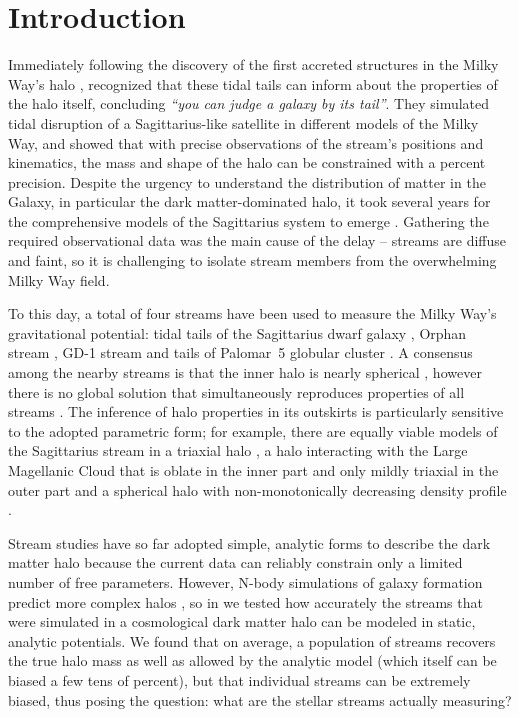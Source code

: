 \documentclass[modern]{aastex61}
\begin{document}

\section{Introduction} \label{sec:intro}
Immediately following the discovery of the first accreted structures in the Milky Way's halo \citep{ibata1994, ti1998}, \citet{johnston1999} recognized that these tidal tails can inform about the properties of the halo itself, concluding \emph{``you can judge a galaxy by its tail''}.
They simulated tidal disruption of a Sagittarius-like satellite in different models of the Milky Way, and showed that with precise observations of the stream's positions and kinematics, the mass and shape of the halo can be constrained with a percent precision.
Despite the urgency to understand the distribution of matter in the Galaxy, in particular the dark matter-dominated halo, it took several years for the comprehensive models of the Sagittarius system to emerge \citep{helmi2004, johnston2005, lm10}.
Gathering the required observational data was the main cause of the delay -- streams are diffuse and faint, so it is challenging to isolate stream members from the overwhelming Milky Way field.

To this day, a total of four streams have been used to measure the Milky Way's gravitational potential: tidal tails of the Sagittarius dwarf galaxy \citep{lm10,gibbons2014,dl2017}, Orphan stream \citep{newberg2010}, GD-1 stream \citep{koposov2010, bowden2015} and tails of Palomar~5 globular cluster \citep{kupper2015}.
A consensus among the nearby streams is that the inner halo is nearly spherical \citep{bovy2016}, however there is no global solution that simultaneously reproduces properties of all streams \citep{pearson2015}.
The inference of halo properties in its outskirts is particularly sensitive to the adopted parametric form; for example, there are equally viable models of the Sagittarius stream in a triaxial halo \citep{lm10}, a halo interacting with the Large Magellanic Cloud that is oblate in the inner part and only mildly triaxial in the outer part \citep{vch2013} and a spherical halo with non-monotonically decreasing density profile \citep{ibata2013}. 

Stream studies have so far adopted simple, analytic forms to describe the dark matter halo because the current data can reliably constrain only a limited number of free parameters.
However, N-body simulations of galaxy formation predict more complex halos \citep[e.g.,][]{diemand2007,springel2008,wetzel2016}, 
so in \citet{bonaca2014} we tested how accurately the streams that were simulated in a cosmological dark matter halo can be modeled in static, analytic potentials.
We found that on average, a population of streams recovers the true halo mass as well as allowed by the analytic model (which itself can be biased a few tens of percent), but that individual streams can be extremely biased, thus posing the question: what are the stellar streams actually measuring?
\end{document}
